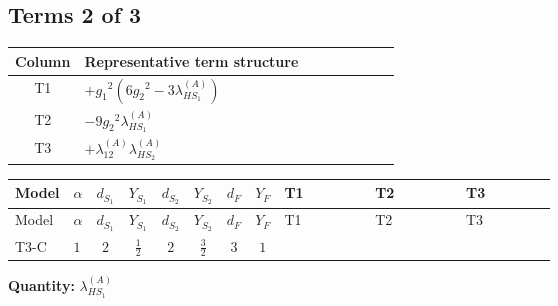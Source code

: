 \documentclass[8pt]{article}
\begin{document}
\begin{landscape}
\subsection*{Terms 2 of 3}
\begin{center}
\begin{tabular}{@{}c >{\raggedright\arraybackslash}p{0.82\linewidth}@{}}
\toprule
Column & Representative term structure \\
\midrule
T1 & \(\displaystyle +{g_1}^2 \left(6 {g_2}^2-3 {\lambda_{HS_1}^{(A)}}\right)\) \\
\midrule
T2 & \(\displaystyle -9 {g_2}^2 {\lambda_{HS_1}^{(A)}}\) \\
\midrule
T3 & \(\displaystyle +{\lambda_{12}^{(A)}} {\lambda_{HS_2}^{(A)}}\) \\
\midrule
\bottomrule
\end{tabular}
\end{center}
\smallskip
\tiny
\begin{longtable}{@{}llcccccc >{\raggedright\arraybackslash}p{0.21\linewidth} >{\raggedright\arraybackslash}p{0.21\linewidth} >{\raggedright\arraybackslash}p{0.21\linewidth}@{}}
\toprule
Model & $\alpha$ & $d_{S_1}$ & $Y_{S_1}$ & $d_{S_2}$ & $Y_{S_2}$ & $d_F$ & $Y_F$ & T1 & T2 & T3 \\
\midrule
\endfirsthead
\toprule
Model & $\alpha$ & $d_{S_1}$ & $Y_{S_1}$ & $d_{S_2}$ & $Y_{S_2}$ & $d_F$ & $Y_F$ & T1 & T2 & T3 \\
\midrule
\endhead
T3-C & $1$ & $2$ & $\frac{1}{2}$ & $2$ & $\frac{3}{2}$ & $3$ & $1$ & \scriptsize\adjustbox{max width=\linewidth}{$\begin{gathered} +{g_1}^2 \left(6 {g_2}^2-3 {\lambda_{HS_1}^{(A)}}\right)\end{gathered}$} & \scriptsize\adjustbox{max width=\linewidth}{$\begin{gathered} -9 {g_2}^2 {\lambda_{HS_1}^{(A)}}\end{gathered}$} & \scriptsize\adjustbox{max width=\linewidth}{$\begin{gathered} +{\lambda_{12}^{(A)}} {\lambda_{HS_2}^{(A)}}\end{gathered}$} \\
\midrule
\bottomrule
\end{longtable}
\clearpage
\noindent\textbf{Quantity: }$\lambda_{HS_1}^{(A)}$\par\smallskip

\end{landscape}
\end{document}
